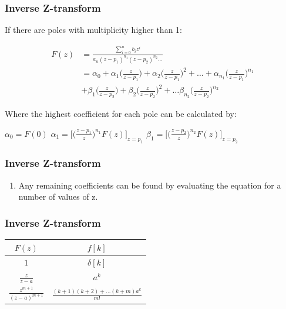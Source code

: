 \begin{frame}
	\frametitle{Inverse Z-transform}
	\begin{enumerate}
		\setcounter{enumi}{\theenumTemp}
		\item If there are poles with multiplicity higher than 1:
		\vspace{-2em}
		\small{
		\begin{center}
			\begin{align}
				F(z) & = \frac{\sum\limits_{i=0}^{n} b_i z^{i}}{a_n(z-p_1)^{n_1}(z-p_2)^{n_2} \dots}\\
				& = \alpha_0 + \alpha_1\bigg(\frac{z}{z-p_1}\bigg) + \alpha_2\bigg(\frac{z}{z-p_1}\bigg)^{2} + \dots + \alpha_{n_1}\bigg(\frac{z}{z-p_1}\bigg)^{n_1} \\
				& + \beta_1 \bigg(\frac{z}{z-p_2}\bigg) + \beta_2 \bigg(\frac{z}{z-p_2}\bigg)^{2} + \dots \beta_{n_2} \bigg(\frac{z}{z-p_2}\bigg)^{n_2}
			\end{align}
		\end{center}
		\item Where the highest coefficient for each pole can be calculated by:
		\begin{center}
			$ \alpha_0 = F(0)$ 		$\alpha_1 = \Bigg[\bigg(\frac{z-p_1}{z}\bigg)^{n_1}F(z)\Bigg]_{z=p_1}$ 	 $\beta_1 = \Bigg[\bigg(\frac{z-p_2}{z}\bigg)^{n_2}F(z)\Bigg]_{z=p_2}$
		\end{center}}
		\setcounter{enumTmp}{\theenumi}
	\end{enumerate}
\end{frame}
\begin{frame}
	\frametitle{Inverse Z-transform}
	\begin{enumerate}
		\setcounter{enumi}{\theenumTmp}
		\item Any remaining coefficients can be found by evaluating the equation for a number of values of z.
	\end{enumerate}
\end{frame}
\begin{frame}
	\frametitle{Inverse Z-transform}
	\begin{tabular}{|c|c|}
		\hline $F(z)$ & $f[k]$ \\
		\hline $1$ & $\delta[k]$ \\
		\hline $\frac{z}{z-a}$ & $ a^{k}$ \\
		\hline $\frac{z^{m+1}}{(z-a)^{m+1}}$ & $\frac{(k+1)(k+2)+ \dots (k+m)a^{k}}{m!}$ \\ 
		\hline 
	\end{tabular} 
\end{frame}
